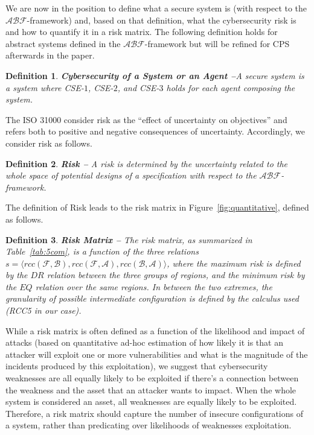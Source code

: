 \documentclass[conference]{IEEEtran}
\newcommand{\assertionRegion}{\mathcal{A}}
\newcommand{\beliefRegion}{\mathcal{B}}
\newcommand{\factRegion}{\mathcal{F}}
\newcommand{\rcc}{rcc}
\newcommand{\abftheory}{\assertionRegion\beliefRegion\factRegion}
\newtheorem{definition}{Definition}%
\begin{document}
We are now in the position to define what a secure system is (with respect to
the $\abftheory$-framework) and, based on that definition, what the cybersecurity risk is and
how to quantify it in a risk matrix. The following definition holds for 
abstract systems defined in the $\abftheory$-framework but will be refined
for CPS afterwards in the paper.
\begin{definition}{\bf Cybersecurity of a System or an Agent --}\label{def:security}
	A secure system is a system where CSE-$1$, CSE-$2$, and CSE-$3$ holds for
	each agent composing the system.
\end{definition}
The ISO 31000 consider risk as the ``effect of uncertainty on objectives'' and
refers both to positive and negative consequences of uncertainty.
Accordingly, we consider risk as follows. 
\begin{definition}{\bf Risk --}
A risk is determined by the uncertainty related to the whole space of potential designs of a specification with respect to the
	$\abftheory$-framework.
\end{definition}
The definition of Risk leads to the risk matrix in
Figure~\ref{fig:quantitative}, defined as follows.
\begin{definition}{\bf Risk Matrix --}
	The risk matrix, as summarized in Table~\ref{tab:5com}, is a function of the three relations
	$s=\langle\rcc(\factRegion,\beliefRegion),\rcc(\factRegion,\assertionRegion),\rcc(\beliefRegion,\assertionRegion)\rangle$,
	where the maximum risk is defined by the $DR$ relation between the
	three groups of regions, and the minimum risk by the $EQ$ relation over
	the same regions. In between the two extremes, the granularity of
	possible intermediate configuration is defined by the calculus used
	(RCC5 in our case).
\end{definition}
While a risk matrix is often defined as a function of the 
likelihood and impact of attacks (based on quantitative ad-hoc estimation
of how likely it is that an attacker will exploit one or more vulnerabilities
and what is the magnitude of the incidents produced by this exploitation), we suggest
that cybersecurity weaknesses are all equally likely to be exploited
if there's a connection between the weakness and the asset that
an attacker wants to impact. When the whole system is considered an asset,
all weaknesses are equally likely to be exploited.
Therefore, a risk matrix should
capture the number of insecure configurations of a system, rather
than predicating over likelihoods of weaknesses exploitation.
\end{document}
